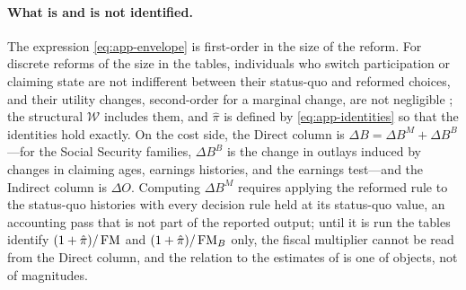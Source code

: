 \paragraph{What is and is not identified.}
The expression \eqref{eq:app-envelope} is first-order in the size of the reform. For discrete reforms of the size in the tables, individuals who switch participation or claiming state are not indifferent between their status-quo and reformed choices, and their utility changes, second-order for a marginal change, are not negligible \citep{kleven2021sufficient}; the structural $\mathcal{W}$ includes them, and $\hat\pi$ is defined by \eqref{eq:app-identities} so that the identities hold exactly. On the cost side, the Direct column is $\Delta B=\Delta B^{M}+\Delta B^{B}$---for the Social Security families, $\Delta B^{B}$ is the change in outlays induced by changes in claiming ages, earnings histories, and the earnings test---and the Indirect column is $\Delta O$. Computing $\Delta B^{M}$ requires applying the reformed rule to the status-quo histories with every decision rule held at its status-quo value, an accounting pass that is not part of the reported output; until it is run the tables identify $(1+\hat\pi)/\operatorname{FM}$ and $(1+\hat\pi)/\operatorname{FM}_B$ only, the fiscal multiplier cannot be read from the Direct column, and the relation to the estimates of \citet{haller2022welfare} is one of objects, not of magnitudes.

